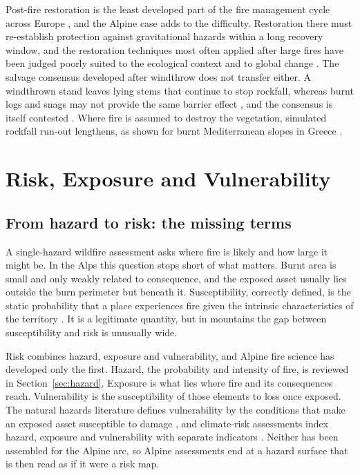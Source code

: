 \documentclass[11pt,a4paper]{article}
\begin{document}
Post-fire restoration is the least developed part of the fire management cycle across Europe \citep{vieira_postfire_2026}, and the Alpine case adds to the difficulty. Restoration there must re-establish protection against gravitational hazards within a long recovery window, and the restoration techniques most often applied after large fires have been judged poorly suited to the ecological context and to global change \citep{mantero_short-term_2023}. The salvage consensus developed after windthrow does not transfer either. A windthrown stand leaves lying stems that continue to stop rockfall, whereas burnt logs and snags may not provide the same barrier effect \citep{costa_biological_2021}, and the consensus is itself contested \citep{seben_impact_2024}. Where fire is assumed to destroy the vegetation, simulated rockfall run-out lengthens, as shown for burnt Mediterranean slopes in Greece \citep{asteriou_assessing_2025}.
\section{Risk, Exposure and Vulnerability}
\label{sec:risk}

\subsection{From hazard to risk: the missing terms}

A single-hazard wildfire assessment asks where fire is likely and how large it might be. In the Alps this question stops short of what matters. Burnt area is small and only weakly related to consequence, and the exposed asset usually lies outside the burn perimeter but beneath it. Susceptibility, correctly defined, is the static probability that a place experiences fire given the intrinsic characteristics of the territory \citep{trucchia_defining_2022}. It is a legitimate quantity, but in mountains the gap between susceptibility and risk is unusually wide.

Risk combines hazard, exposure and vulnerability, and Alpine fire science has developed only the first. Hazard, the probability and intensity of fire, is reviewed in Section~\ref{sec:hazard}. Exposure is what lies where fire and its consequences reach. Vulnerability is the susceptibility of those elements to loss once exposed. The natural hazards literature defines vulnerability by the conditions that make an exposed asset susceptible to damage \citep{papathomakohle_towards_2025}, and climate-risk assessments index hazard, exposure and vulnerability with separate indicators \citep{pede_mountain_2022}. Neither has been assembled for the Alpine arc, so Alpine assessments end at a hazard surface that is then read as if it were a risk map.
\end{document}
